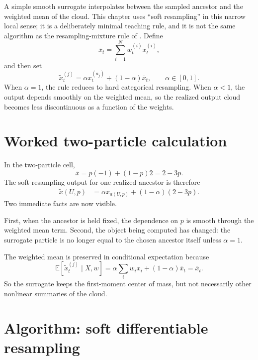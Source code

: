 A simple smooth surrogate interpolates between the sampled ancestor and the
weighted mean of the cloud.  This chapter uses ``soft resampling'' in this
narrow local sense; it is a deliberately minimal teaching rule, and it is not
the same algorithm as the resampling-mixture rule of
\citet{karkus2018particle}.  Define
\begin{equation}
\label{eq:bf-soft-mean}
  \bar x_t = \sum_{i=1}^N w_t^{(i)}x_t^{(i)},
\end{equation}
and then set
\begin{equation}
\label{eq:bf-soft-rule-eqn}
  \tilde x_t^{(j)}
  =
  \alpha x_t^{(a_j)} + (1-\alpha)\bar x_t,
  \qquad
  \alpha\in[0,1].
\end{equation}
When \(\alpha=1\), the rule reduces to hard categorical resampling.  When
\(\alpha<1\), the output depends smoothly on the weighted mean, so the realized
output cloud becomes less discontinuous as a function of the weights.

\section{Worked two-particle calculation}
\label{sec:bf-soft-worked-cell}

In the two-particle cell,
\[
  \bar x = p(-1)+(1-p)2 = 2-3p.
\]
The soft-resampling output for one realized ancestor is therefore
\begin{align}
\label{eq:bf-soft-two-particle-output}
  \tilde x(U,p)
  &=
  \alpha x_{a(U,p)} + (1-\alpha)(2-3p).
\end{align}
Two immediate facts are now visible.

First, when the ancestor is held fixed, the dependence on \(p\) is smooth through
the weighted mean term.  Second, the object being computed has changed: the
surrogate particle is no longer equal to the chosen ancestor itself unless
\(\alpha=1\).

The weighted mean is preserved in conditional expectation because
\begin{equation}
\label{eq:bf-soft-mean-preservation}
  \mathbb E[\tilde x_t^{(j)}\mid X,w]
  =
  \alpha\sum_i w_i x_i + (1-\alpha)\bar x_t
  =
  \bar x_t.
\end{equation}
So the surrogate keeps the first-moment center of mass, but not necessarily other
nonlinear summaries of the cloud.

\section{Algorithm: soft differentiable resampling}
\label{sec:bf-soft-algorithm}

